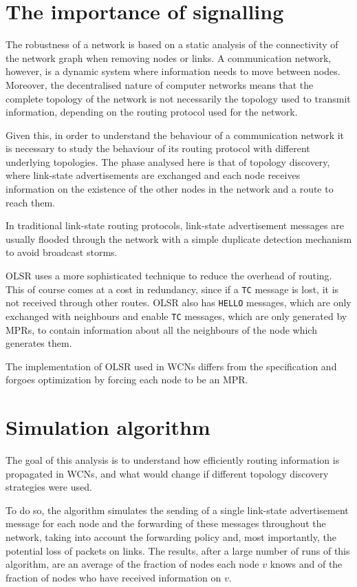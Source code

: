 \documentclass[a4paper,11pt,twoside,openright]{memoir}
\begin{document}
\section{The importance of signalling}\label{the-importance-of-signalling}

The robustness of a network is based on a static analysis of the
connectivity of the network graph when removing nodes or links. A
communication network, however, is a dynamic system where information
needs to move between nodes. Moreover, the decentralised nature of
computer networks means that the complete topology of the network is not
necessarily the topology used to transmit information, depending on the
routing protocol used for the network.

Given this, in order to understand the behaviour of a communication
network it is necessary to study the behaviour of its routing protocol
with different underlying topologies. The phase analysed here is that of
topology discovery, where link-state advertisements are exchanged and
each node receives information on the existence of the other nodes in
the network and a route to reach them.

In traditional link-state routing protocols, link-state advertisement
messages are usually flooded through the network with a simple duplicate
detection mechanism to avoid broadcast storms.

OLSR uses a more sophisticated technique to reduce the overhead of
routing. This of course comes at a cost in redundancy, since if a \texttt{TC}
message is lost, it is not received through other routes.
OLSR also has \texttt{HELLO} messages, which are only exchanged with
neighbours and enable \texttt{TC} messages, which are only generated by
MPRs, to contain information about all the neighbours of the node which
generates them.

The implementation of OLSR used in WCNs differs from the specification
and forgoes optimization by forcing each node to be an MPR.

\section{Simulation algorithm}\label{simulation-algorithm}

The goal of this analysis is to understand how efficiently routing
information is propagated in WCNs, and what would change if different
topology discovery strategies were used.

To do so, the algorithm simulates the sending of a single
link-state advertisement message for each node and the forwarding of
these messages throughout the network, taking into account the forwarding
policy and, most importantly, the potential loss of packets on links.
The results, after a large number of runs of this algorithm, are an average
of the fraction of nodes each node $v$ knows and of the fraction of nodes
who have received information on $v$.
\end{document}
